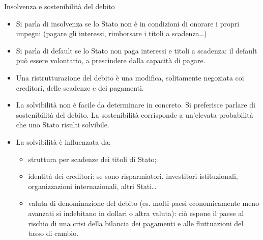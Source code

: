 \documentclass[aspectratio=64,11pt]{beamer}
\begin{document}
\begin{frame}{Insolvenza e sostenibilità del debito}

  \begin{itemize}
  \item Si parla di \alert{insolvenza} se lo Stato non è in condizioni di
    onorare i propri impegni (pagare gli interessi, rimborsare i titoli a
    scadenza\ldots{})
  \item Si parla di \alert{default} se lo Stato non paga interessi e titoli a
    scadenza: il default può essere volontario, a prescindere dalla capacità
    di pagare.
  \item Una \alert{ristrutturazione} del debito è una modifica, solitamente
    negoziata coi creditori, delle scadenze e dei pagamenti.
  \item La \alert{solvibilità} non è facile da determinare in concreto. Si
    preferisce parlare di \alert{sostenibilità} del debito. La sostenibilità
    corrisponde a un'elevata probabilità che uno Stato risulti solvibile.
  \item La solvibilità è influenzata da:
    \begin{itemize}
    \item struttura per scadenze dei titoli di Stato;
    \item identità dei creditori: se sono risparmiatori, investitori
      istituzionali, organizzazioni internazionali, altri Stati\ldots{}
    \item valuta di denominazione del debito (es. molti paesi economicamente
      meno avanzati si indebitano in dollari o altra valuta): ciò espone il
      paese al rischio di una crisi della bilancia dei pagamenti e alle
      fluttuazioni del tasso di cambio.
    \end{itemize}
  \end{itemize}
\end{frame}
\end{document}
